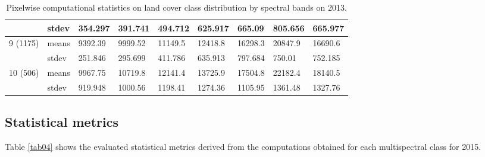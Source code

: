 \documentclass[jmse,article,submit,pdftex,moreauthors]{Definitions/mdpi}
\begin{document}
\begin{table}[H]
\begin{tabularx}{\linewidth}{p{1.3cm}p{1.0cm}p{1.0cm}p{1.0cm}p{1.0cm}p{1.0cm}p{1.0cm}p{1.0cm}p{1.0cm}}
    & stdev & 354.297 & 391.741 & 494.712 & 625.917 & 665.09 & 805.656 & 665.977 \\
    \midrule
    \multirow{2}{*}{9 (1175)} & means & 9392.39 & 9999.52 & 11149.5 & 12418.8 & 16298.3 & 20847.9 & 16690.6 \\
    & stdev & 251.846 & 295.699 & 411.786 & 635.913 & 797.684 & 750.01 & 752.185 \\
    \midrule
  \multirow{2}{*}{10 (506)} & means & 9967.75 & 10719.8 & 12141.4 & 13725.9 & 17504.8 & 22182.4 & 18140.5 \\
   & stdev & 919.948 & 1000.56 & 1198.41 & 1274.36 & 1105.95 & 1361.48 & 1327.76 \\
\bottomrule
\end{tabularx}
  \caption{Pixelwise computational statistics on land cover class distribution by spectral bands on 2013.}
  \label{tab03}
\end{table}

\subsection{Statistical metrics}
Table \ref{tab04} shows the evaluated statistical metrics derived from the computations obtained for each multispectral class for 2015.
\end{document}
